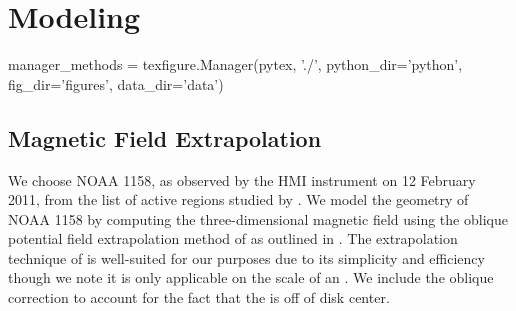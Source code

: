 \section{Modeling}\label{modeling}

\begin{pycode}
manager_methods = texfigure.Manager(pytex, './', python_dir='python', fig_dir='figures', data_dir='data')
\end{pycode}

\subsection{Magnetic Field Extrapolation}\label{field}

We choose \AR{} NOAA 1158, as observed by the HMI instrument \citet{hoeksema_helioseismic_2014} on 12 February 2011, from the list of active regions studied by \citet{warren_systematic_2012}. We model the geometry of \AR{} NOAA 1158 by computing the three-dimensional magnetic field using the oblique potential field extrapolation method of \citet{schmidt_observable_1964} as outlined in \citet[section 3]{sakurai_greens_1982}. The extrapolation technique of \citeauthor{schmidt_observable_1964} is well-suited for our purposes due to its simplicity and efficiency though we note it is only applicable on the scale of an \AR{}. We include the oblique correction to account for the fact that the \AR{} is off of disk center.

